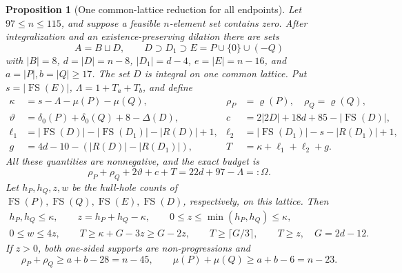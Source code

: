\documentclass[11pt,a4paper]{article}
\newtheorem{proposition}[theorem]{Proposition}
\theoremstyle{remark}
\newcommand{\FS}{\operatorname{FS}}
\newcommand{\rhoD}{\varrho}
\begin{document}
\begin{proposition}[One common-lattice reduction for all endpoints]\label{u96:prop:universal-lattice}
Let $97\leq n\leq115$, and suppose a feasible $n$-element set contains
zero. After integralization and an existence-preserving dilation there
are sets
\[
 A=B\sqcup D,\qquad D\supset D_1\supset E=P\cup\{0\}\cup(-Q)
\]
with $|B|=8$, $d=|D|=n-8$, $|D_1|=d-4$, $e=|E|=n-16$,
and $a=|P|,b=|Q|\geq17$. The set $D$ is integral on one common lattice.
Put $s=|\FS(E)|$, $\Lambda=1+T_a+T_b$, and define
\[
\begin{aligned}
 \kappa&=s-\Lambda-\mu(P)-\mu(Q),&
 \rho_P&=\rhoD(P),\quad\rho_Q=\rhoD(Q),\\
 \vartheta&=\delta_0(P)+\delta_0(Q)+8-\Delta(D),&
 c&=2|2D|+18d+85-|\FS(D)|,\\
 \ell_1&=|\FS(D)|-|\FS(D_1)|-|R(D)|+1,&
 \ell_2&=|\FS(D_1)|-s-|R(D_1)|+1,\\
 g&=4d-10-(|R(D)|-|R(D_1)|),&
 T&=\kappa+\ell_1+\ell_2+g.
\end{aligned}
\]
All these quantities are nonnegative, and the exact budget is
\begin{equation}
 \rho_P+\rho_Q+2\vartheta+c+T=22d+97-\Lambda=:\Omega.
 \label{u96:eq:budget-new}
\end{equation}
Let $h_P,h_Q,z,w$ be the hull-hole counts of $\FS(P),\FS(Q),
\FS(E),\FS(D)$, respectively, on this lattice. Then
\begin{gather}
 h_P,h_Q\leq\kappa,\qquad z=h_P+h_Q-\kappa,\qquad
 0\leq z\leq\min(h_P,h_Q)\leq\kappa,\label{u96:eq:holes-core-new}\\
 0\leq w\leq4z,\qquad
 T\geq\kappa+G-3z\geq G-2z,\qquad
 T\geq\lceil G/3\rceil,\qquad T\geq z,\quad G=2d-12.
 \label{u96:eq:universal-holes}
\end{gather}
If $z>0$, both one-sided supports are non-progressions and
\[
 \rho_P+\rho_Q\geq a+b-28=n-45,\qquad
 \mu(P)+\mu(Q)\geq a+b-6=n-23.
\]
\end{proposition}
\end{document}
